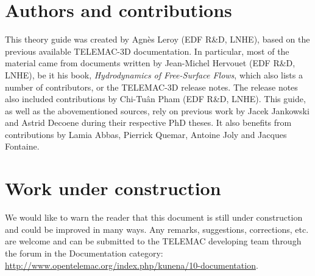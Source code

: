 \documentclass[Telemac3D]{../../data/TelemacDoc} %
\begin{document}
\let\cleardoublepage\clearpage
\title{}
\subtitle{Theory guide}
\version{\telmaversion}
\date{\today}
\maketitle
\clearpage


\newpage

\thispagestyle{empty}

\chapter*{Authors and contributions}
This theory guide was created by Agnès Leroy (EDF R\&D, LNHE), based on the previous available TELEMAC-3D
documentation. In particular, most of the material came from documents written by Jean-Michel
Hervouet (EDF R\&D, LNHE), be it his book, \textit{Hydrodynamics of Free-Surface Flows}, which also lists a number of contributors, or the
TELEMAC-3D release notes. The release notes also included contributions by Chi-Tuân Pham (EDF R\&D, LNHE).
This guide, as well as the abovementioned sources, rely on previous work by Jacek Jankowski and Astrid Decoene during their respective PhD theses.
It also benefits from contributions by Lamia Abbas, Pierrick Quemar, Antoine Joly and Jacques Fontaine.

\newpage

\chapter*{Work under construction}\label{workunderconstruction}
We would like to warn the reader that this document is still under construction and
could be improved in many ways. Any remarks, suggestions, corrections, etc. are welcome
and can be submitted to the TELEMAC developing team through the forum in the Documentation
category: \url{http://www.opentelemac.org/index.php/kunena/10-documentation}.

\newpage
\end{document}
